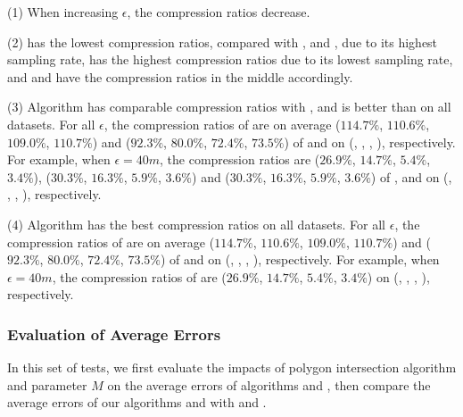 \ni (1) When increasing $\epsilon$, the compression ratios decrease.


\ni (2) \pricar has the lowest compression ratios, compared with \truck, \sercar and \geolife, due to its highest sampling rate,
\truck has the highest compression ratios due to its lowest sampling rate, and \sercar and \geolife have the compression ratios in the middle accordingly.

\ni \textcolor[rgb]{1.00,0.00,0.00}{(3)} Algorithm \cist has \textcolor[rgb]{1.00,0.00,0.00}{comparable} compression ratios with \dpa, and is better than \squishe on all datasets.
For all $\epsilon$, the compression ratios of \cist are on average ($114.7\%$, $110.6\%$, $109.0\%$, $110.7\%$) and ($92.3\%$, $80.0\%$, $72.4\%$, {$73.5\%$}) of \dpa and \squishe on (\truck, \sercar, \geolife, \pricar), respectively.
For example, when $\epsilon = 40m$, the compression ratios are ($26.9\%$, $14.7\%$, $5.4\%$, $3.4\%$), ($30.3\%$, $16.3\%$, $5.9\%$, $3.6\%$) and ($30.3\%$, $16.3\%$, $5.9\%$, $3.6\%$) of \dpa, \cist and \squishe on (\truck, \sercar, \geolife, \pricar), respectively.

\ni \textcolor[rgb]{1.00,0.00,0.00}{(4)} Algorithm \cista has \textcolor[rgb]{1.00,0.00,0.00}{the best} compression ratios on all datasets.
For all $\epsilon$, the compression ratios of \cista are on average ($114.7\%$, $110.6\%$, $109.0\%$, $110.7\%$) and ($92.3\%$, $80.0\%$, $72.4\%$, {$73.5\%$}) of \dpa and \squishe on (\truck, \sercar, \geolife, \pricar), respectively.
For example, when $\epsilon = 40m$, the compression ratios of \cista are ($26.9\%$, $14.7\%$, $5.4\%$, $3.4\%$) on (\truck, \sercar, \geolife, \pricar), respectively.







\subsubsection{Evaluation of Average Errors}
In this set of tests, we first evaluate the impacts of polygon intersection algorithm \rpia and parameter $M$ on the average errors of algorithms \cist and \cista, then compare the average errors of our algorithms \cist and \cista with \dpa and \squishe.

